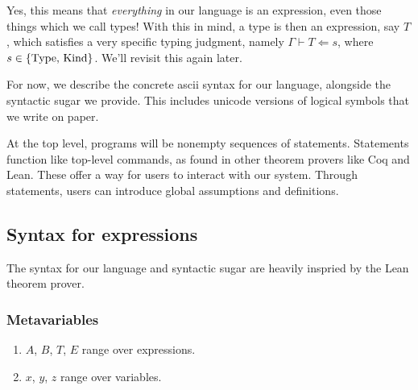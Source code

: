 \documentclass{article}
\begin{document}
Yes, this means that \textit{everything} in our language is an expression, even
those things which we call types!
With this in mind, a type is then an expression, say $T$, which satisfies a very
specific typing judgment, namely $\Gamma \vdash T \Leftarrow s$,
where $s \in \{ \operatorname{Type}, \, \operatorname{Kind} \}$. We'll revisit this again later.

For now, we describe the concrete ascii syntax for our language, alongside
the syntactic sugar we provide. This includes unicode versions of logical symbols
that we write on paper.

At the top level, programs will be nonempty sequences of statements.
Statements function like top-level commands, as found in other theorem provers
like Coq and Lean. These offer a way for users to interact with our system.
Through statements, users can introduce global assumptions and definitions.

\subsection{Syntax for expressions}

The syntax for our language and syntactic sugar are heavily inspried by the
Lean theorem prover.

\subsubsection{Metavariables}
\begin{enumerate}
  \item $A$, $B$, $T$, $E$ range over expressions. 
  \item $x$, $y$, $z$ range over variables.
\end{enumerate}
\end{document}
